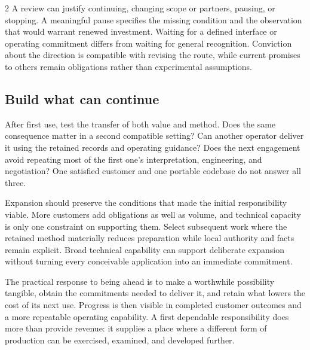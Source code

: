\begin{multicols}{2}
A review can justify continuing, changing scope or partners, pausing, or
stopping. A meaningful pause specifies the missing condition and the
observation that would warrant renewed investment. Waiting for a defined
interface or operating commitment differs from waiting for general
recognition. Conviction about the direction is compatible with revising
the route, while current promises to others remain obligations rather
than experimental assumptions.

\subsection{Build what can continue}\label{build-what-can-continue}

After first use, test the transfer of both value and method. Does the
same consequence matter in a second compatible setting? Can another
operator deliver it using the retained records and operating guidance?
Does the next engagement avoid repeating most of the first one's
interpretation, engineering, and negotiation? One satisfied customer and
one portable codebase do not answer all three.

Expansion should preserve the conditions that made the initial
responsibility viable. More customers add obligations as well as volume,
and technical capacity is only one constraint on supporting them. Select
subsequent work where the retained method materially reduces preparation
while local authority and facts remain explicit. Broad technical
capability can support deliberate expansion without turning every
conceivable application into an immediate commitment.

The practical response to being ahead is to make a worthwhile
possibility tangible, obtain the commitments needed to deliver it, and
retain what lowers the cost of its next use. Progress is then visible in
completed customer outcomes and a more repeatable operating capability.
A first dependable responsibility does more than provide revenue: it
supplies a place where a different form of production can be exercised,
examined, and developed further.

\end{multicols}

\HandoverArt

